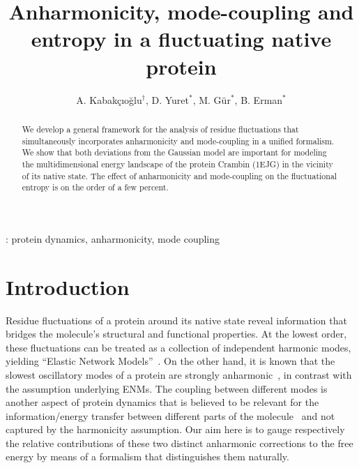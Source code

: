 \documentclass[12pt,article]{iopart}
\begin{document}
\title{Anharmonicity, mode-coupling and entropy in a fluctuating
  native protein}

\author{A. Kabak{\c c}{\i}o{\u g}lu$^\dagger$, D. Yuret$^*$, M. G{\" u}r$^*$, B. Erman$^{*}$}
\address{Colleges of Sciences$^\dagger$ and Engineering$^*$, Ko{\c c} University, Sar{\i}yer, 34450, {\. I}stanbul, Turkey}


\begin{abstract}
We develop a general framework for the analysis of residue
fluctuations that simultaneously incorporates anharmonicity and
mode-coupling in a unified formalism. We show that both deviations
from the Gaussian model are important for modeling the
multidimensional energy landscape of the protein Crambin (1EJG) in the
vicinity of its native state.  The effect of anharmonicity and
mode-coupling on the fluctuational entropy is on the order of a few
percent.

\end{abstract}


\vspace{2pc}
: protein dynamics, anharmonicity, mode coupling

\submitto{\PB}

\maketitle

\section{Introduction}

Residue fluctuations of a protein around its native state reveal
information that bridges the molecule's structural and functional
properties.  At the lowest order, these fluctuations can be treated as
a collection of independent harmonic modes, yielding ``Elastic Network
Models''~\cite{bahar1997direct,atilgan2001anisotropy}. On the other
hand, it is known that the slowest oscillatory modes of a protein are
strongly
anharmonic~\cite{hayward1994harmonic,pontiggia2007anharmonicity,yogurtcu2009statistical},
in contrast with the assumption underlying ENMs. The coupling between
different modes is another aspect of protein dynamics that is believed
to be relevant for the information/energy transfer between different
parts of the molecule~\cite{moritsugu2000vibrational,leitner2008energy} and not
captured by the harmonicity assumption. Our aim here is to gauge respectively
the relative contributions of these two distinct anharmonic corrections to the free
energy by means of a formalism that distinguishes them naturally.
\end{document}
